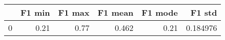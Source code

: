 \begin{tabular}{lrrrrr}
\toprule
{} &  F1 min &  F1 max &  F1 mean &  F1 mode &    F1 std \\
\midrule
0 &    0.21 &    0.77 &    0.462 &     0.21 &  0.184976 \\
\bottomrule
\end{tabular}
